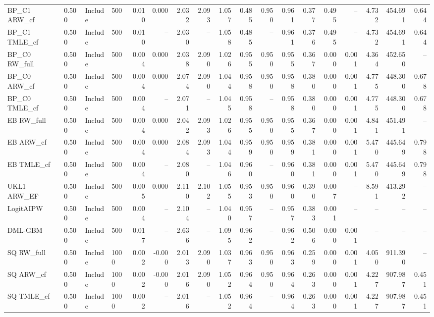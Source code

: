 \begin{tabular}{llllrrrrrrrrrrrrrr}
BP\_C1 ARW\_cf & 0.500 & Include & 500 & 0.010 & 0.000 & 2.032 & 2.093 & 1.057 & 0.485 & 0.950 & 0.961 & 0.377 & 0.495 & -- & 4.732 & 454.691 & 0.644 \\
BP\_C1 TMLE\_cf & 0.500 & Include & 500 & 0.010 & -- & 2.030 & -- & 1.058 & 0.485 & -- & 0.961 & 0.376 & 0.495 & -- & 4.732 & 454.691 & 0.644 \\
BP\_C0 RW\_full & 0.500 & Include & 500 & 0.004 & 0.000 & 2.038 & 2.090 & 1.026 & 0.955 & 0.950 & 0.955 & 0.367 & 0.000 & 0.001 & 4.364 & 452.650 & -- \\
BP\_C0 ARW\_cf & 0.500 & Include & 500 & 0.004 & 0.000 & 2.074 & 2.090 & 1.044 & 0.958 & 0.950 & 0.958 & 0.380 & 0.000 & 0.001 & 4.775 & 448.300 & 0.678 \\
BP\_C0 TMLE\_cf & 0.500 & Include & 500 & 0.004 & -- & 2.071 & -- & 1.045 & 0.958 & -- & 0.958 & 0.380 & 0.000 & 0.001 & 4.775 & 448.300 & 0.678 \\
EB RW\_full & 0.500 & Include & 500 & 0.004 & 0.000 & 2.042 & 2.093 & 1.026 & 0.955 & 0.950 & 0.955 & 0.367 & 0.000 & 0.001 & 4.841 & 451.491 & -- \\
EB ARW\_cf & 0.500 & Include & 500 & 0.004 & 0.000 & 2.084 & 2.093 & 1.044 & 0.959 & 0.950 & 0.959 & 0.381 & 0.000 & 0.001 & 5.470 & 445.649 & 0.798 \\
EB TMLE\_cf & 0.500 & Include & 500 & 0.004 & -- & 2.080 & -- & 1.046 & 0.960 & -- & 0.960 & 0.381 & 0.000 & 0.001 & 5.470 & 445.649 & 0.798 \\
UKL1 ARW\_EF & 0.500 & Include & 500 & 0.005 & 0.000 & 2.110 & 2.102 & 1.055 & 0.953 & 0.950 & 0.960 & 0.390 & 0.007 & -- & 8.591 & 413.292 & -- \\
LogitAIPW & 0.500 & Include & 500 & 0.004 & -- & 2.104 & -- & 1.040 & 0.957 & -- & 0.957 & 0.383 & 0.001 & -- & -- & -- & -- \\
DML-GBM & 0.500 & Include & 500 & 0.017 & -- & 2.636 & -- & 1.095 & 0.962 & -- & 0.962 & 0.506 & 0.000 & 0.001 & -- & -- & -- \\
SQ RW\_full & 0.500 & Include & 1000 & 0.002 & -0.000 & 2.013 & 2.090 & 1.037 & 0.963 & 0.950 & 0.963 & 0.259 & 0.000 & 0.001 & 4.050 & 911.390 & -- \\
SQ ARW\_cf & 0.500 & Include & 1000 & 0.002 & -0.000 & 2.016 & 2.090 & 1.052 & 0.964 & 0.950 & 0.964 & 0.263 & 0.000 & 0.001 & 4.227 & 907.987 & 0.451 \\
SQ TMLE\_cf & 0.500 & Include & 1000 & 0.002 & -- & 2.016 & -- & 1.052 & 0.964 & -- & 0.964 & 0.263 & 0.000 & 0.001 & 4.227 & 907.987 & 0.451 \\

\end{tabular}
